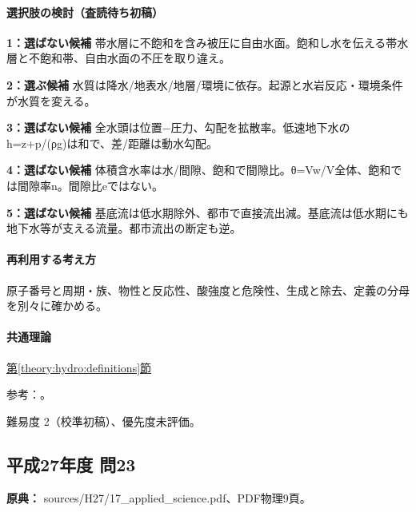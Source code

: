 \paragraph{選択肢の検討（査読待ち初稿）}\mbox{}\par

\noindent\textbf{1：選ばない候補} 帯水層に不飽和を含み被圧に自由水面。飽和し水を伝える帯水層と不飽和帯、自由水面の不圧を取り違え。\par

\noindent\textbf{2：選ぶ候補} 水質は降水/地表水/地層/環境に依存。起源と水岩反応・環境条件が水質を変える。\par

\noindent\textbf{3：選ばない候補} 全水頭は位置−圧力、勾配を拡散率。低速地下水のh=\allowbreak{}z+p/(ρg)は和で、差/距離は動水勾配。\par

\noindent\textbf{4：選ばない候補} 体積含水率は水/間隙、飽和で間隙比。θ=Vw/V全体、飽和では間隙率n。間隙比eではない。\par

\noindent\textbf{5：選ばない候補} 基底流は低水期除外、都市で直接流出減。基底流は低水期にも地下水等が支える流量。都市流出の断定も逆。\par

\paragraph{再利用する考え方} 原子番号と周期・族、物性と反応性、酸強度と危険性、生成と除去、定義の分母を別々に確かめる。

\paragraph{共通理論} \hyperref[theory:hydro:definitions]{第\ref*{theory:hydro:definitions}節}

\par 参考：\cite{inorganic_waterchem,inorganic_hydro_ref}。

\par 難易度 2（校準初稿）、優先度未評価。

\subsection{平成27年度 問23}
\label{q:h27-reg-applied-23}

\noindent\textbf{原典：} sources/H27/17\_applied\_science.pdf、PDF物理9頁。

